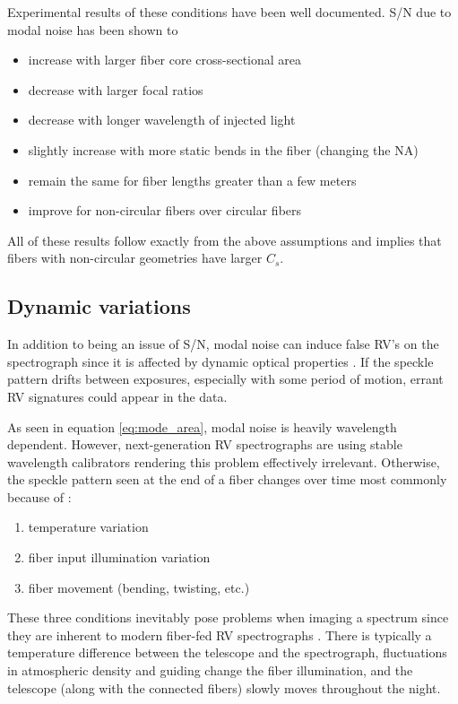 \documentclass[twocolumn]{emulateapj}
\begin{document}
Experimental results of these conditions have been well documented. S/N due to modal noise has been shown to
\begin{itemize}
\item increase with larger fiber core cross-sectional area \citep{Sablowski2015, Lemke2010}
\item decrease with larger focal ratios \citep{Sablowski2015, Baudrand2001}
\item decrease with longer wavelength of injected light \citep{Baudrand2001}
\item slightly increase with more static bends in the fiber (changing the NA) \citep{Imai1979}
\item remain the same for fiber lengths greater than a few meters \citep{Baudrand2001}
\item improve for non-circular fibers over circular fibers \citep{Sturmer2016, Sablowski2015}
\end{itemize}
All of these results follow exactly from the above assumptions and implies that fibers with non-circular geometries have larger $C_{s}$.

\subsection{Dynamic variations}

In addition to being an issue of S/N, modal noise can induce false RV's on the spectrograph since it is affected by dynamic optical properties \citep{Mahadevan2014}. If the speckle pattern drifts between exposures, especially with some period of motion, errant RV signatures could appear in the data.

As seen in equation \ref{eq:mode_area}, modal noise is heavily wavelength dependent. However, next-generation RV spectrographs are using stable wavelength calibrators rendering this problem effectively irrelevant. Otherwise, the speckle pattern seen at the end of a fiber changes over time most commonly because of \citep{Epworth1978}:
\begin{enumerate}
\item temperature variation
\item fiber input illumination variation
\item fiber movement (bending, twisting, etc.)
\end{enumerate}
These three conditions inevitably pose problems when imaging a spectrum since they are inherent to modern fiber-fed RV spectrographs \citep{Baudrand2001, Mahadevan2014}. There is typically a temperature difference between the telescope and the spectrograph, fluctuations in atmospheric density and guiding change the fiber illumination, and the telescope (along with the connected fibers) slowly moves throughout the night.
\end{document}
